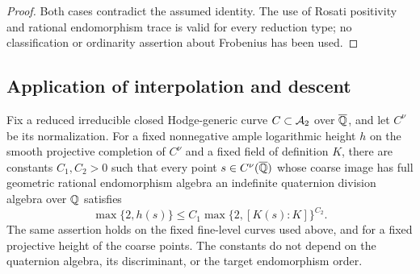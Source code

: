 \begin{proof}
Both cases contradict the assumed identity.  The use of Rosati positivity
and rational endomorphism trace is valid for every reduction type; no
classification or ordinarity assertion about Frobenius has been used.
\end{proof}

\subsection{Application of interpolation and descent}

\begin{theorem}\label{thm:height}
Fix a reduced irreducible closed Hodge-generic curve $C\subset\mathcal A_2$
over $\overline{\mathbb Q}$, and let $C^\nu$ be its normalization.  For a fixed
nonnegative ample logarithmic height $h$ on the smooth projective
completion of $C^\nu$ and a fixed field of definition $K$, there are
constants $C_1,C_2>0$ such that every point $s\in C^\nu(\overline{\mathbb Q})$ whose
coarse image has full geometric rational endomorphism algebra an
indefinite quaternion division algebra over $\mathbb Q$ satisfies
\[
 \max\{2,h(s)\}\le C_1\max\{2,[K(s):K]\}^{C_2}.
\]
The same assertion holds on the fixed fine-level curves used above,
and for a fixed projective height of the coarse points.  The constants
do not depend on the quaternion algebra, its discriminant, or
the target endomorphism order.
\end{theorem}

